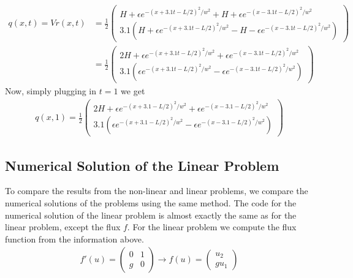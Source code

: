 \begin{align*}
q(x,t) = Vr(x,t) &= \frac{1}{2} \begin{pmatrix}
H + \epsilon e^{-(x+3.1t-L/2)^2/w^2} +H + \epsilon e^{-(x-3.1t-L/2)^2/w^2} \\
3.1(H + \epsilon e^{-(x+3.1t-L/2)^2/w^2} -H - \epsilon e^{-(x-3.1t-L/2)^2/w^2})
\end{pmatrix} \\
&= \frac{1}{2}\begin{pmatrix}
 2H + \epsilon e^{-(x+3.1t-L/2)^2/w^2} + \epsilon e^{-(x-3.1t-L/2)^2/w^2} \\
3.1( \epsilon e^{-(x+3.1t-L/2)^2/w^2} - \epsilon e^{-(x-3.1t-L/2)^2/w^2})
\end{pmatrix}
\end{align*} 
Now, simply plugging in $t=1$ we get
\begin{align*}
q(x,1) = \frac{1}{2}\begin{pmatrix}
 2H + \epsilon e^{-(x+3.1-L/2)^2/w^2} + \epsilon e^{-(x-3.1-L/2)^2/w^2} \\
3.1( \epsilon e^{-(x+3.1-L/2)^2/w^2} - \epsilon e^{-(x-3.1-L/2)^2/w^2})
\end{pmatrix}
\end{align*}

\subsection{Numerical Solution of the Linear Problem}
To compare the results from the non-linear and linear problems, we compare the numerical solutions of the problems using the same method. The code for the numerical solution of the linear problem is almost exactly the same as for the linear problem, except the flux $f$. For the linear problem we compute the flux function from the information above. 
\begin{align*}
f'(u) = \begin{pmatrix}
0 & 1 \\
g & 0
\end{pmatrix} \rightarrow 
f(u) = \begin{pmatrix}
u_2 \\
gu_1
\end{pmatrix}
\end{align*}